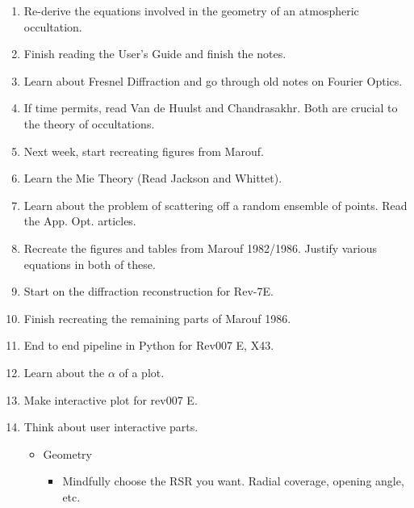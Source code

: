 \documentclass[crop=false,class=article,oneside]{standalone}
\begin{document}
        \begin{enumerate}
            \item Re-derive the equations involved in the geometry of an atmospheric occultation.
            \item Finish reading the User's Guide and finish the notes.
            \item Learn about Fresnel Diffraction and go through old notes on Fourier Optics.
            \item If time permits, read Van de Huulst and Chandrasakhr. Both are crucial to the theory of occultations.
            \item Next week, start recreating figures from Marouf.
            \item Learn the Mie Theory (Read Jackson and Whittet).
            \item Learn about the problem of scattering off a random ensemble of points. Read the App. Opt. articles.
            \item Recreate the figures and tables from Marouf 1982/1986. Justify various equations in both of these.
            \item Start on the diffraction reconstruction for Rev-7E.
            \item Finish recreating the remaining parts of Marouf 1986.
            \item End to end pipeline in Python for Rev007 E, X43.
            \begin{itemize}
            \end{itemize}
            \item Learn about the $\alpha$ of a plot.
            \item Make interactive plot for rev007 E.
            \item Think about user interactive parts.
            \begin{itemize}
                \item Geometry
                \begin{itemize}
                    \item Mindfully choose the RSR you want. Radial coverage, opening angle, etc.

\end{itemize}
\end{itemize}
\end{enumerate}
\end{document}
